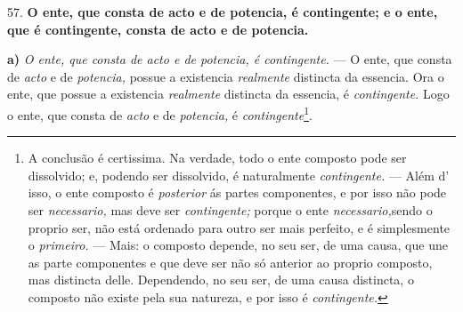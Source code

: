 57. \textbf{O ente, que consta de acto e de potencia, é contingente; e o ente, que é contingente, consta de acto e de potencia.}

\textbf{a)} \emph{O ente, que consta de acto e de potencia, é contingente.} --- O ente, que consta de \emph{acto} e de \emph{potencia,} possue a existencia \emph{realmente} distincta da essencia. Ora o ente, que possue a existencia \emph{realmente} distincta da essencia, é \emph{contingente.} Logo o ente, que consta de \emph{acto} e de \emph{potencia,} é \emph{contingente}\footnote{A conclusão é certissima. Na verdade, todo o ente composto pode ser dissolvido; e, podendo ser dissolvido, é naturalmente \emph{contingente.} --- Além d' isso, o ente composto é \emph{posterior} ás partes componentes, e por isso não pode ser \emph{necessario,} mas deve ser \emph{contingente;} porque o ente \emph{necessario,}sendo o proprio ser, não está ordenado para outro ser mais perfeito, e é simplesmente o \emph{primeiro.} --- Mais: o composto depende, no seu ser, de uma causa, que une as parte componentes e que deve ser não só anterior ao proprio composto, mas distincta delle. Dependendo, no seu ser, de uma causa distincta, o composto não existe pela sua natureza, e por isso é \emph{contingente.}}.